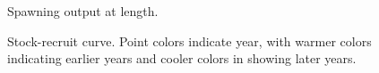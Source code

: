 \documentclass[
]{scrartcl}
\begin{document}
\begin{figure}


\caption{\label{fig-spoutlen}Spawning output at length.}

\end{figure}%

\begin{figure}


\caption{\label{fig-SRcurve}Stock-recruit curve. Point colors indicate
year, with warmer colors indicating earlier years and cooler colors in
showing later years.}

\end{figure}%
\end{document}
